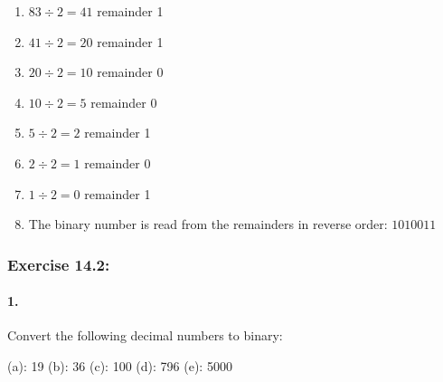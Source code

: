 \documentclass{article}
\begin{document}
\begin{enumerate}
    \item $83 \div 2 = 41$ remainder 1
    \item $41 \div 2 = 20$ remainder 1
    \item $20 \div 2 = 10$ remainder 0
    \item $10 \div 2 = 5$ remainder 0
    \item $5 \div 2 = 2$ remainder 1
    \item $2 \div 2 = 1$ remainder 0
    \item $1 \div 2 = 0$ remainder 1
    \item The binary number is read from the remainders in reverse order: $1010011$
\end{enumerate}

\vspace*{0.5cm}


\newpage

\subsubsection*{Exercise 14.2:} 
\vspace*{0.25cm}

\paragraph*{1.}
Convert the following decimal numbers to binary:

\vspace*{0.25cm}
(a): 19 (b): 36 (c): 100 (d): 796 (e): 5000
\end{document}

